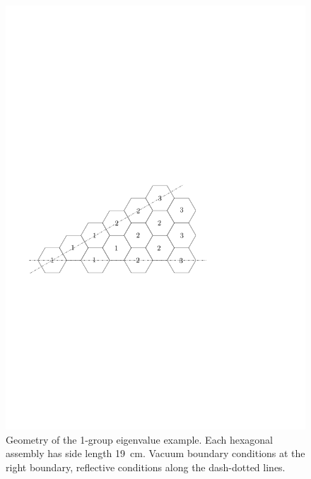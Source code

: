 \begin{figure}[!ht]
\centering
  \includegraphics[scale=.55]{hex/def}
  \caption[Geometry of the 1-group eigenvalue example]{Geometry of the 1-group eigenvalue example. Each hexagonal
  assembly has side length \SI{19}{cm}.
  Vacuum boundary conditions at the right boundary, reflective conditions along the dash-dotted lines.}
  \label{fig:50}
\end{figure} 

